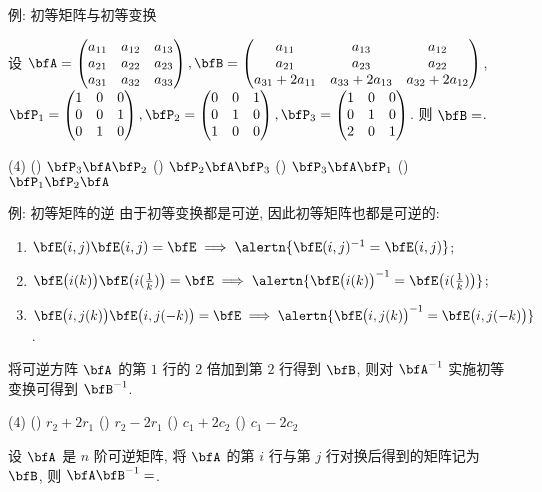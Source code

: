 \begin{frame}{例: 初等矩阵与初等变换}
	\onslide<+->
	\begin{exercise}
		设 $\bfA=\begin{pmatrix}
			a_{11}&a_{12}&a_{13}\\
			a_{21}&a_{22}&a_{23}\\
			a_{31}&a_{32}&a_{33}
		\end{pmatrix},\bfB=\begin{pmatrix}
			a_{11}&a_{13}&a_{12}\\
			a_{21}&a_{23}&a_{22}\\
			a_{31}+2a_{11}&a_{33}+2a_{13}&a_{32}+2a_{12}
		\end{pmatrix}$,\\
		$\bfP_1=\begin{pmatrix}
			1&0&0\\0&0&1\\0&1&0
		\end{pmatrix},\bfP_2=\begin{pmatrix}
			0&0&1\\0&1&0\\1&0&0
		\end{pmatrix},\bfP_3=\begin{pmatrix}
			1&0&0\\0&1&0\\2&0&1
		\end{pmatrix}$.
		则 $\bfB=$.
		\begin{taskschoice}(4)
			() $\bfP_3\bfA\bfP_2$
			() $\bfP_2\bfA\bfP_3$
			() $\bfP_3\bfA\bfP_1$
			() $\bfP_1\bfP_2\bfA$
		\end{taskschoice}
	\end{exercise}
\end{frame}


\begin{frame}{例: 初等矩阵的逆}
	\onslide<+->
	由于初等变换都是可逆, 因此初等矩阵也都是可逆的:
	\begin{enumerate}
		\item $\bfE(i,j)\bfE(i,j)=\bfE\implies \alertn{\bfE(i,j)^{-1}=\bfE(i,j)}$;
		\item $\bfE\bigl(i(k)\bigr)\bfE\bigl(i(\frac1k)\bigr)=\bfE\implies\alertn{\bfE\bigl(i(k)\bigr)^{-1}=\bfE\bigl(i(\frac1k)\bigr)}$;
		\item $\bfE\bigl(i,j(k)\bigr)\bfE\bigl(i,j(-k)\bigr)=\bfE\implies\alertn{\bfE\bigl(i,j(k)\bigr)^{-1}=\bfE\bigl(i,j(-k)\bigr)}$.
	\end{enumerate}
	\onslide<+->
	\begin{example}
		将可逆方阵 $\bfA$ 的第 $1$ 行的 $2$ 倍加到第 $2$ 行得到 $\bfB$, 则对 $\bfA^{-1}$ 实施初等变换可得到 $\bfB^{-1}$.
		\begin{taskschoice}(4)
			() $r_2+2r_1$
			() $r_2-2r_1$
			() $c_1+2c_2$
			() $c_1-2c_2$
		\end{taskschoice}
	\end{example}
	\onslide<+->
	\begin{exercise}
		设 $\bfA$ 是 $n$ 阶可逆矩阵, 将 $\bfA$ 的第 $i$ 行与第 $j$ 行对换后得到的矩阵记为 $\bfB$, 则 $\bfA\bfB^{-1}=$\fillblankframe[3cm]{$\bfE(i,j)$}.
	\end{exercise}
\end{frame}



